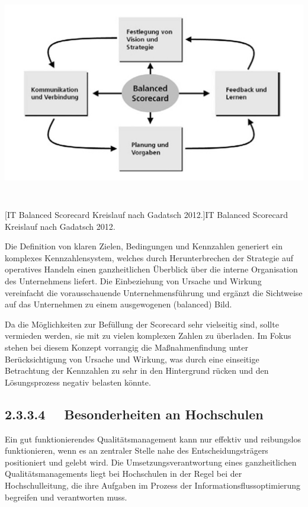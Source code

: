 \documentclass{article}
\begin{document}
\begin{center}
\includegraphics[width=15.502cm,height=10.145cm]{mbaktualisiert-img/mbaktualisiert-img002.jpg}
[IT Balanced Scorecard Kreislauf nach Gadatsch 2012.]{IT Balanced Scorecard Kreislauf nach Gadatsch
2012.}

\end{center}

\bigskip

Die Definition von klaren Zielen, Bedingungen und Kennzahlen generiert ein komplexes Kennzahlensystem, welches durch
Herunterbrechen der Strategie auf operatives Handeln einen ganzheitlichen Überblick über die interne Organisation des
Unternehmens liefert. Die Einbeziehung von Ursache und Wirkung vereinfacht die vorausschauende Unternehmensführung und
ergänzt die Sichtweise auf das Unternehmen zu einem ausgewogenen (balanced) Bild. 


\bigskip

Da die Möglichkeiten zur Befüllung der Scorecard sehr vielseitig sind, sollte vermieden werden, sie mit zu vielen
komplexen Zahlen zu überladen. Im Fokus stehen bei diesem Konzept vorrangig die Maßnahmenfindung unter Berücksichtigung
von Ursache und Wirkung, was durch eine einseitige Betrachtung der Kennzahlen zu sehr in den Hintergrund rücken und den
Lösungsprozess negativ belasten könnte.

\subsection[2.3.3.4 \ \ Besonderheiten an Hochschulen]{2.3.3.4 \ \ Besonderheiten an Hochschulen}
Ein gut funktionierendes Qualitätsmanagement kann nur effektiv und reibungslos funktionieren, wenn es an zentraler
Stelle nahe des Entscheidungsträgers positioniert und gelebt wird. Die Umsetzungsverantwortung eines ganzheitlichen
Qualitätsmanagements liegt bei Hochschulen in der Regel bei der Hochschulleitung, die ihre Aufgaben im Prozess der
Informationsflussoptimierung begreifen und verantworten muss. 
\end{document}
